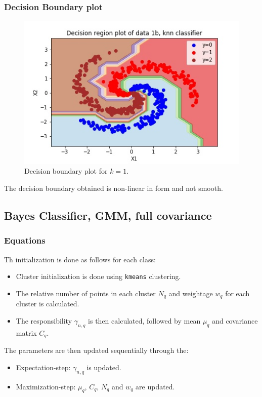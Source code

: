\documentclass[11pt,a4paper]{article}
\newcommand{\noi}{\noindent}
\def\tt#1{\texttt{#1}}
\begin{document}
\subsubsection{Decision Boundary plot}

\begin{figure}[H]
    \centering
    \includegraphics[scale=1]{images/1b_KNN_decision_region.jpg}
    \caption{Decision boundary plot for $k=1$.}
    \label{fig:1b_decreg_KNN}
\end{figure}

\noi
The decision boundary obtained is non-linear in form and not smooth. 

\break
\subsection{Bayes Classifier, GMM, full covariance}
\subsubsection{Equations}
Th initialization is done as follows for each class:
\begin{itemize}
    \itemsep0em
    \item Cluster initialization is done using \tt{kmeans} clustering.
    \item The relative number of points in each cluster $N_q$ and weightage $w_q$ for each cluster is calculated.
    \item The responsibility $\gamma_{n,q}$ is then calculated, followed by mean $\mu_q$ and covariance matrix $C_q$.
\end{itemize}

\noi
The parameters are then updated sequentially through the:
\begin{itemize}
    \itemsep0em
    \item Expectation-step: $\gamma_{n,q}$ is updated.
    \item Maximization-step: $\mu_q$, $C_q$, $N_q$ and $w_q$ are updated.
\end{itemize}
\end{document}
